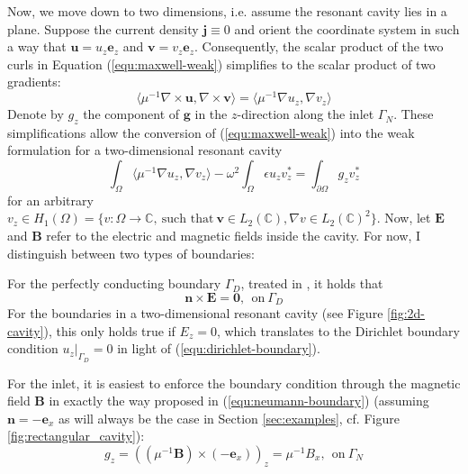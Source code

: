 \documentclass[11pt, a4paper]{article}
\begin{document}
Now, we move down to two dimensions, i.e. assume the resonant cavity lies in a plane.
Suppose the current density $\mathbf{j} \equiv 0$ and orient the coordinate
system in such a way that $\mathbf{u} = u_z \mathbf{e}_z$ and 
$\mathbf{v} = v_z \mathbf{e}_z$. Consequently, the scalar product of the two 
curls in Equation (\ref{equ:maxwell-weak}) simplifies to the scalar product 
of two gradients:
\begin{equation}
    \langle \mu^{-1} \nabla \times \mathbf{u}, \nabla \times \mathbf{v} \rangle
    = \langle \mu^{-1} \nabla u_z, \nabla v_z \rangle
\end{equation}
Denote by $g_z$ the component of $\mathbf{g}$ in the $z$-direction along the
inlet $\Gamma_N$. These simplifications allow the conversion of 
(\ref{equ:maxwell-weak}) into the weak formulation for a two-dimensional
resonant cavity
\begin{equation}
    \int_{\Omega} \langle \mu^{-1} \nabla u_z, \nabla v_z \rangle
    - \omega^2 \int_{\Omega} \epsilon u_z v_z^{\ast}
    = \int_{\partial \Omega} g_z v_z^{\ast} \label{equ:maxwell-weak-resonant-cavity}
\end{equation}
for an arbitrary $v_z \in H_1(\Omega) = \{v : \Omega \to \mathbb{C},~\text{such that}~\mathbf{v}\in L_2(\mathbb{C}), \nabla v \in L_2(\mathbb{C})^2\}$.
Now, let $\mathbf{E}$ and $\mathbf{B}$ refer to the electric and magnetic fields inside
the cavity. For now, I distinguish between two types of boundaries:

For the perfectly conducting boundary $\Gamma_D$, treated in \citep{monk}, it holds that
\begin{equation}
    \mathbf{n} \times \mathbf{E} = \mathbf{0},~~\text{on}~\Gamma_D \label{equ:perfect-conductor-boundary}
\end{equation}
For the boundaries in a two-dimensional resonant cavity (see Figure 
\ref{fig:2d-cavity}), this only holds true if $E_z = 0$, which translates
to the Dirichlet boundary condition $\left.u_z\right|_{\Gamma_D} = 0$
in light of (\ref{equ:dirichlet-boundary}).

For the inlet, it is easiest to enforce the boundary condition through the
magnetic field $\mathbf{B}$ in exactly the way proposed in
(\ref{equ:neumann-boundary}) (assuming $\mathbf{n} = -\mathbf{e}_x$ as
will always be the case in Section \ref{sec:examples}, cf. Figure \ref{fig:rectangular_cavity}):
\begin{equation}
    g_z = (({\mu^{-1} \mathbf{B}}) \times (-\mathbf{e}_x))_z = \mu^{-1} B_x,~~\text{on}~\Gamma_N
\end{equation}
\end{document}
